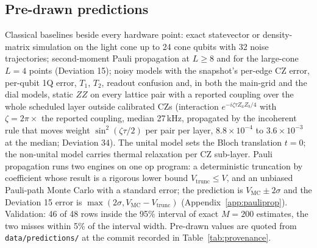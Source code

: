 \documentclass[aps,prxquantum,reprint,superscriptaddress,nofootinbib,longbibliography,amsmath,amssymb]{revtex4-2}
\begin{document}
\subsection{Pre-drawn predictions}\label{sec:predictions}
Classical baselines beside every hardware point: exact statevector or density-matrix simulation on the light cone up to 24 cone qubits with 32 noise trajectories; second-moment Pauli propagation at $L \geq 8$ and for the large-cone $L = 4$ points (Deviation 15); noisy models with the snapshot's per-edge CZ error, per-qubit 1Q error, $T_1$, $T_2$, readout confusion and, in both the main-grid and the dial models, static $ZZ$ on every lattice pair with a reported coupling over the whole scheduled layer outside calibrated CZs (interaction $e^{-i\zeta\tau Z_aZ_b/4}$ with $\zeta = 2\pi\times$ the reported coupling, median 27\,kHz, propagated by the incoherent rule that moves weight $\sin^2(\zeta\tau/2)$ per pair per layer, $8.8\times10^{-4}$ to $3.6\times10^{-3}$ at the median; Deviation 34). The unital model sets the Bloch translation $t = 0$; the non-unital model carries thermal relaxation per CZ sub-layer. Pauli propagation runs two engines on one op program: a deterministic truncation by coefficient whose result is a rigorous lower bound $V_{\mathrm{trunc}} \leq V$, and an unbiased Pauli-path Monte Carlo with a standard error; the prediction is $V_{\mathrm{MC}} \pm 2\sigma$ and the Deviation 15 error is $\max(2\sigma, V_{\mathrm{MC}} - V_{\mathrm{trunc}})$ (Appendix~\ref{app:pauliprop}). Validation: 46 of 48 rows inside the 95\% interval of exact $M = 200$ estimates, the two misses within 5\% of the interval width. Pre-drawn values are quoted from \texttt{data/predictions/} at the commit recorded in Table~\ref{tab:provenance}.
\end{document}
